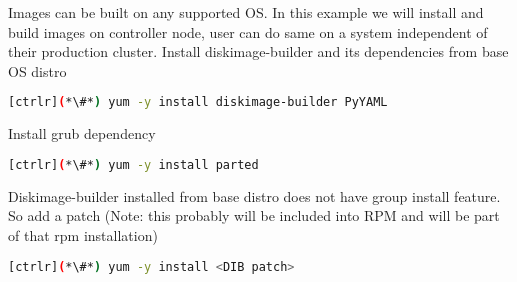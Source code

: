 
Images can be built on any supported OS. In this example we will install and build images on controller node, user can do same on a system independent of their production cluster. Install diskimage-builder and its dependencies from base OS distro

\begin{lstlisting}[language=bash,keywords={}]
[ctrlr](*\#*) yum -y install diskimage-builder PyYAML

\end{lstlisting}

Install grub dependency

\begin{lstlisting}[language=bash,keywords={}]
[ctrlr](*\#*) yum -y install parted
\end{lstlisting}

Diskimage-builder installed from base distro does not have group install feature. So add a patch (Note: this probably will be included into RPM and will be part of that rpm installation)

\begin{lstlisting}[language=bash,keywords={}]
[ctrlr](*\#*) yum -y install <DIB patch>
\end{lstlisting}

